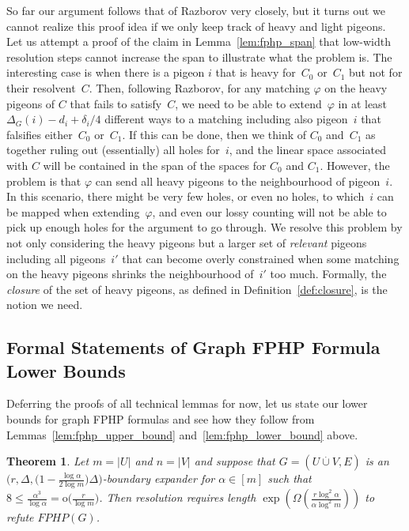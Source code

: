 \documentclass{article}
\newtheorem{theorem}{Theorem}\newtheorem{lemma}[theorem]{Lemma}\newtheorem{proposition}[theorem]{Proposition}\newtheorem{corollary}[theorem]{Corollary}\newtheorem{definition}[theorem]{Definition}\newtheorem{claim}[theorem]{Claim}\newtheorem{remark}[theorem]{Remark}
\newcommand{\Littleoh}[1]{\mathrm{o} \bigl( #1 \bigr)}
\newcommand{\BIGOMEGA}[1]{\Omega \left( #1 \right)}
\newcommand{\setsize}[1]{\lvert#1\rvert}
\newcommand{\disjointunion}{\overset{.}{\cup}}
\newcommand{\introduceterm}[1]{{\emph{#1}}}
\newcommand{\reflem}[1]{Lemma~\ref{#1}}
\newcommand{\reftwolems}[2]{Lemmas~\ref{#1} and~\ref{#2}}
\newcommand{\refdef}[1]{Definition~\ref{#1}}
\newcommand{\formulaformat}[1]{\mathit{#1}}
\newcommand{\graphfphpnot}[1][G]{\formulaformat{FPHP}({#1})}
\newcommand{\heavy}{heavy\xspace}
\newcommand{\light}{light\xspace}
\newcommand{\GFPHP}{G\text{-}FPHP}
\renewcommand{\GFPHP}{\graphfphpnot[G]}
\renewcommand{\deg}[2][XXXXXXXXXXXX]{\Delta_{#1}(#2)}
\newcommand{\dimLi}{\deg[G]{i} - d_i + \delta_i/4}
\newcommand{\GdegMax}{\Delta}
\newcommand{\matcha}{\varphi}
\newcommand{\squeezesubsection}[1]{\subsection{#1}}
\numberwithin{equation}{section}
\begin{document}
So far our argument follows that of Razborov very closely, but
it turns out we cannot realize this proof idea if we only keep track
of \heavy and \light pigeons. Let us attempt a proof of the claim in
\reflem{lem:fphp_span} that low-width resolution steps cannot increase
the span to illustrate what the problem is.
The interesting case is when there is a pigeon $i$ that is \heavy
for~$C_0$ or~$C_1$
but not for their resolvent~$C$. 
Then, following Razborov, for any matching $\matcha$ on the \heavy
pigeons of $C$ that  fails to satisfy~$C$, 
we need to be able to extend~$\matcha$ in at
least $\dimLi$ different ways to a matching including also pigeon~$i$
that falsifies either~$C_0$ or~$C_1$. If this can be done, then we think
of $C_0$ and~$C_1$ as together ruling out (essentially) all holes
for~$i$, and  the linear space associated with $C$ will be contained
in the span of the spaces for $C_0$ and $C_1$.
However, the problem is that $\matcha$ can send all \heavy pigeons to
the neighbourhood of pigeon~$i$. In this scenario, there might be very
few holes, or even no holes, to which~$i$ can be mapped when
extending~$\matcha$, and even our lossy counting will not be able to
pick up enough holes for the argument to go through.
We resolve this problem by not only considering the \heavy pigeons but
a larger set of \introduceterm{relevant} pigeons including all pigeons~$i'$
that can become overly constrained when some matching on the \heavy pigeons
shrinks the neighbourhood of~$i'$ too much.
Formally, the \introduceterm{closure} of the set of \heavy pigeons,
as defined in \refdef{def:closure},
is the notion we need.


 
\squeezesubsection{Formal Statements of Graph FPHP Formula Lower Bounds}
\label{sec:fphp_results}


Deferring the proofs of all technical lemmas for now, 
let us state our lower bounds for graph FPHP formulas and see how they
follow from  
\reftwolems{lem:fphp_upper_bound}{lem:fphp_lower_bound}
above.



\begin{theorem} \label{thm:main}
  Let
  $m = \setsize{ U }$ and $n = \setsize{ V }$ and suppose that
  $
  G = (U 
  \disjointunion
  V, E)
  $
  is an
  $\bigl( 
  r, 
  \GdegMax, 
  \bigl(1 - \frac{ \log \alpha}{ 2 \log m} \bigr)\GdegMax \bigr)
  $-boundary 
  expander
  for $\alpha \in [m]$ such that 
  $8 \le \frac{ \alpha^3 }{ \log \alpha} = \Littleoh{\frac{ r }{ \log m }}$.
  Then resolution requires length
  $\exp \left( \BIGOMEGA {\frac{ r \log^2\alpha }{ \alpha \log^2 m }} \right)$
  to refute $\GFPHP$.
\end{theorem}
\end{document}
